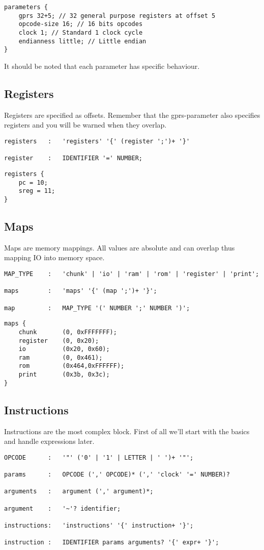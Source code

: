 \lstset{caption=Example parameters}
\begin{lstlisting}
parameters {
	gprs 32+5; // 32 general purpose registers at offset 5
	opcode-size 16; // 16 bits opcodes
	clock 1; // Standard 1 clock cycle
	endianness little; // Little endian
}
\end{lstlisting}

It should be noted that each parameter has specific behaviour.

\subsection{Registers}
Registers are specified as offsets. Remember that the gprs-parameter also
specifies registers and you will be warned when they overlap.
\lstset{caption=Register specification}
\begin{lstlisting}
registers	:	'registers' '{' (register ';')+ '}'

register	:	IDENTIFIER '=' NUMBER;
\end{lstlisting}

\lstset{caption=Example register specification}
\begin{lstlisting}
registers {
	pc = 10;
	sreg = 11;
}
\end{lstlisting}

\subsection{Maps}
Maps are memory mappings. All values are absolute and can overlap thus mapping
IO into memory space.
\lstset{caption=Memory mapping specification}
\begin{lstlisting}
MAP_TYPE	:	'chunk' | 'io' | 'ram' | 'rom' | 'register' | 'print';

maps		:	'maps' '{' (map ';')+ '}';

map			:	MAP_TYPE '(' NUMBER ';' NUMBER ')';
\end{lstlisting}

\lstset{caption=Example memory mapping}
\begin{lstlisting}
maps {
	chunk		(0, 0xFFFFFFF);
	register	(0, 0x20);
	io			(0x20, 0x60);
	ram			(0, 0x461);
	rom			(0x464,0xFFFFFF);
	print		(0x3b, 0x3c);
}
\end{lstlisting}

\subsection{Instructions}
Instructions are the most complex block. First of all we'll start with the
basics and handle expressions later.
\lstset{caption=Instruction specification}
\begin{lstlisting}
OPCODE		:	'"' ('0' | '1' | LETTER | ' ')+ '"';

params		:	OPCODE (',' OPCODE)* (',' 'clock' '=' NUMBER)?

arguments	:	argument (',' argument)*;

argument	:	'~'? identifier;

instructions:	'instructions' '{' instruction+ '}';

instruction	:	IDENTIFIER params arguments? '{' expr+ '}';
\end{lstlisting}

